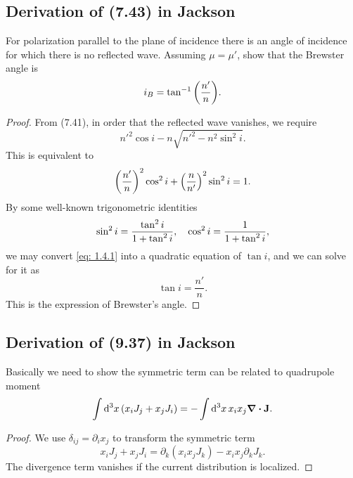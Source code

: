 \documentclass[10pt]{article}
\begin{document}
\subsection{Derivation of (7.43) in Jackson}
For polarization parallel to the plane of incidence there is an angle of incidence for which there is no reflected wave. Assuming $\mu = \mu'$, show that the Brewster angle is
\begin{equation}
	i_B = \tan^{-1} \qty(\frac{n'}{n}).
\end{equation}
\begin{proof}
	From (7.41), in order that the reflected wave vanishes, we require
	\begin{equation}
		n'^2 \cos i - n \sqrt{n'^2 - n^2 \sin^2 i}.
	\end{equation}
	This is equivalent to
	\begin{equation}
		\qty(\frac{n'}{n})^2 \cos^2 i + \qty(\frac{n}{n'})^2 \sin^2 i = 1. \label{eq: 1.4.1}
	\end{equation}
	By some well-known trigonometric identities
	\begin{equation}
		\sin^2 i = \frac{\tan^2 i}{1+ \tan^2 i}\qc \cos^2 i = \frac{1}{1 + \tan^2 i},
	\end{equation}
	we may convert \eqref{eq: 1.4.1} into a quadratic equation of $\tan i$, and we can solve for it as
	\begin{equation}
		\tan i = \frac{n'}{n}.
	\end{equation}
	This is the expression of Brewster's angle.
\end{proof}

\subsection{Derivation of (9.37) in Jackson}

Basically we need to show the symmetric term can be related to quadrupole moment
\begin{equation}
	\int \dd[3]{x}(x_i J_j + x_j J_i) = -\int \dd[3]{x} x_i x_j \div{\vb{J}}.
\end{equation}
\begin{proof}
	We use $\delta_{ij} = \partial_i x_j$ to transform the symmetric term
	\begin{equation}
		x_i J_j + x_j J_i = \partial_k (x_i x_j J_k) - x_i x_j \partial_k J_k.
	\end{equation}
	The divergence term vanishes if the current distribution is localized.
\end{proof}
\end{document}
